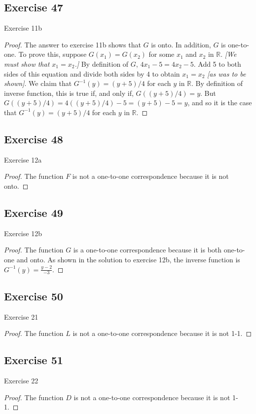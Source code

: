 \documentclass[14pt]{extarticle}
\newcommand{\R}{\mathbb{R}}
\begin{document}
\subsection{Exercise 47}
Exercise 11b
\begin{proof}
    The answer to exercise 11b shows that $G$ is onto. In addition, $G$ is one-to-one. To prove this, suppose
    \(G(x_1) = G(x_2)\) for some $x_1$ and $x_2$ in $\R$. {\it [We must show that \(x_1 = x_2\).]} By definition of $G$,
    \(4x_1 - 5 = 4x_2 - 5\). Add 5 to both sides of this equation and divide both sides by 4 to obtain \(x_1 = x_2\)
    {\it [as was to be shown]}. We claim that \(G^{-1}(y) = (y + 5)/4\) for each $y$ in $\R$. By definition of inverse
    function, this is true if, and only if, \(G((y + 5)/4) = y\). But \(G((y+5)/4) = 4((y + 5)/4)-5=(y + 5) - 5 = y\),
    and so it is the case that \(G^{-1}(y) = (y + 5)/4\) for each $y$ in $\R$.
\end{proof}

\subsection{Exercise 48}
Exercise 12a
\begin{proof}
    The function $F$ is not a one-to-one correspondence because it is not onto.
\end{proof}

\subsection{Exercise 49}
Exercise 12b
\begin{proof}
    The function $G$ is a one-to-one correspondence because it is both one-to-one and onto. As shown in the solution to
    exercise 12b, the inverse function is \(G^{-1}(y) = \frac{y-2}{-3}\).
\end{proof}

\subsection{Exercise 50}
Exercise 21
\begin{proof}
    The function $L$ is not a one-to-one correspondence because it is not 1-1.
\end{proof}

\subsection{Exercise 51}
Exercise 22
\begin{proof}
    The function $D$ is not a one-to-one correspondence because it is not 1-1.
\end{proof}
\end{document}
